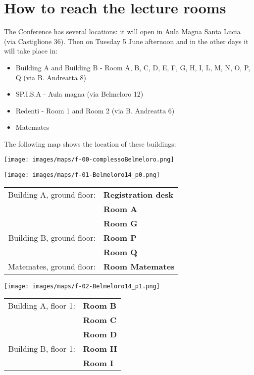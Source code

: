 \section*{How to reach the lecture rooms}
The Conference has several locations: it will open in Aula Magna Santa Lucia (via Castiglione 36).
Then on Tuesday 5 June afternoon and in the other days it will take place in:

\bigskip

\begin{itemize}
\item Building A and Building B - Room A, B, C, D, E, F, G, H, I, L, M, N, O, P, Q (via B. Andreatta 8)
\item SP.I.S.A - Aula magna (via Belmeloro 12)
\item Redenti - Room 1 and Room 2 (via B. Andreatta 6)
\item Matemates
\end{itemize}

\bigskip

\noindent The following map shows the location of these buildings:

\bigskip

\texttt{[image: images/maps/f-00-complessoBelmeloro.png]}

\newpage
\hspace*{-1cm}
\texttt{[image: images/maps/f-01-Belmeloro14\_p0.png]}
\vfill

\hfill
\colorbox{siamblue!50}{\large
\begin{tabular}{ r l }
  Building A, ground floor: & \textbf{Registration desk} \\
                            & \textbf{Room A} \\
                            & \textbf{Room G} \\
  Building B, ground floor: & \textbf{Room P} \\
                            & \textbf{Room Q} \\
  Matemates, ground floor:  & \textbf{Room Matemates}
\end{tabular}
}

\newpage
\hspace*{-1cm}
\texttt{[image: images/maps/f-02-Belmeloro14\_p1.png]}
\vfill

\hfill
\colorbox{siamblue!50}{\large
\begin{tabular}{ r l }
  Building A, floor 1: & \textbf{Room B} \\
                       & \textbf{Room C} \\
                       & \textbf{Room D} \\
  Building B, floor 1: & \textbf{Room H} \\
                       & \textbf{Room I}
\end{tabular}
}

